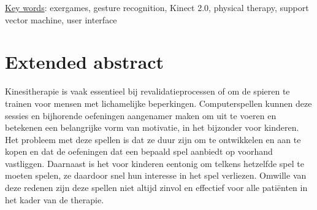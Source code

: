 




\underline{Key words}: exergames, gesture recognition, Kinect 2.0, physical therapy, support vector machine, user interface


\chapter*{Extended abstract}

Kinesitherapie is vaak essentieel bij revalidatieprocessen of om de spieren te trainen voor mensen met lichamelijke beperkingen. Computerspellen kunnen deze sessies en bijhorende oefeningen aangenamer maken om uit te voeren en betekenen een belangrijke vorm van motivatie, in het bijzonder voor kinderen. Het probleem met deze spellen is dat ze duur zijn om te ontwikkelen en aan te kopen en dat de oefeningen dat een bepaald spel aanbiedt op voorhand vastliggen. Daarnaast is het voor kinderen eentonig om telkens hetzelfde spel te moeten spelen, ze daardoor snel hun interesse in het spel verliezen. Omwille van deze redenen zijn deze spellen niet altijd zinvol en effectief voor alle pati\"enten in het kader van de therapie.\\

